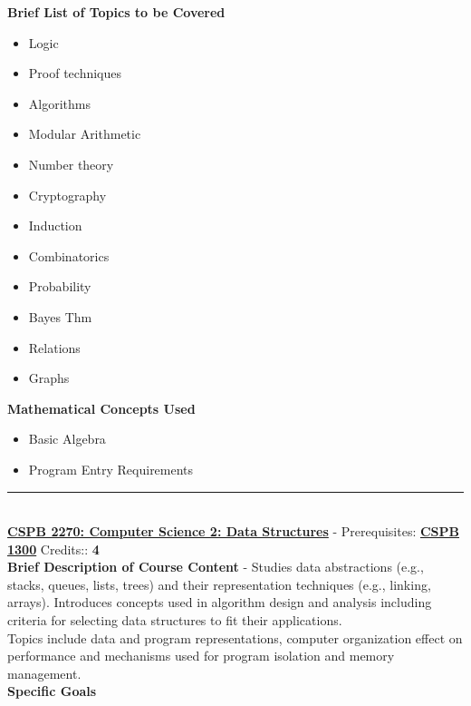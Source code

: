 \documentclass{article}
\newcommand{\horizontalline}{\noindent \rule{\textwidth}{0.5pt} \\}
\begin{document}
\noindent \textbf{Brief List of Topics to be Covered}
\begin{itemize}
    \item Logic
    \item Proof techniques
    \item Algorithms
    \item Modular Arithmetic
    \item Number theory
    \item Cryptography
    \item Induction
    \item Combinatorics
    \item Probability
    \item Bayes Thm
    \item Relations
    \item Graphs
\end{itemize}

\noindent \textbf{Mathematical Concepts Used}
\begin{itemize}
    \item Basic Algebra
    \item Program Entry Requirements
\end{itemize}
\horizontalline
\noindent \href{https://www.colorado.edu/program/cspb/cspb-2270-computer-science-2-data-structures}{\textbf{CSPB 2270: Computer Science 2: Data Structures}} - Prerequisites: \href{https://www.colorado.edu/program/cspb/cspb-1300-computer-science-1-starting-computing}{\textbf{CSPB 1300}} Credits:: \textbf{4} \\

\noindent \textbf{Brief Description of Course Content} - Studies data abstractions (e.g., stacks, queues, lists, trees) and their representation techniques (e.g., linking, arrays). Introduces concepts used in algorithm design and analysis including criteria for selecting data structures to fit their applications. \\

\noindent Topics include data and program representations, computer organization effect on performance and mechanisms used for program isolation and memory management. \\

\noindent \textbf{Specific Goals} \\
\end{document}
